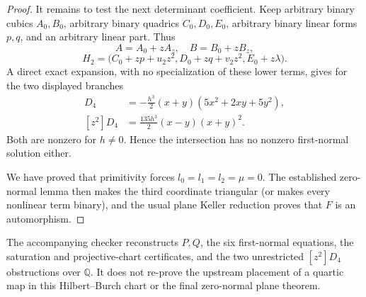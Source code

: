 \begin{proof}
It remains to test the next determinant coefficient.  Keep arbitrary binary
cubics $A_0,B_0$, arbitrary binary quadrics $C_0,D_0,E_0$, arbitrary binary
linear forms $p,q$, and an arbitrary linear part.  Thus
\[
 A=A_0+zA_z,\quad B=B_0+zB_z,
\]
\[
 H_2=\bigl(C_0+zp+u_2z^2,
           D_0+zq+v_2z^2,
           E_0+z\lambda\bigr).
\]
A direct exact expansion, with no specialization of these lower terms, gives
for the two displayed branches
\begin{align*}
 [z^2]D_4
   &=-\frac{h^3}{2}(x+y)(5x^2+2xy+5y^2),\\
 [z^2]D_4
   &=\frac{135h^3}{2}(x-y)(x+y)^2.
\end{align*}
Both are nonzero for $h\ne0$.  Hence the intersection has no nonzero
first-normal solution either.

We have proved that primitivity forces
$l_0=l_1=l_2=\mu=0$.  The established zero-normal lemma then makes the third
coordinate triangular (or makes every nonlinear term binary), and the usual
plane Keller reduction proves that $F$ is an automorphism.
\end{proof}

\begin{remark}
The accompanying checker reconstructs $P,Q$, the six first-normal equations,
the saturation and projective-chart certificates, and the two unrestricted
$[z^2]D_4$ obstructions over $\mathbb Q$.  It does not re-prove the upstream
placement of a quartic map in this Hilbert--Burch chart or the final
zero-normal plane theorem.
\end{remark}
